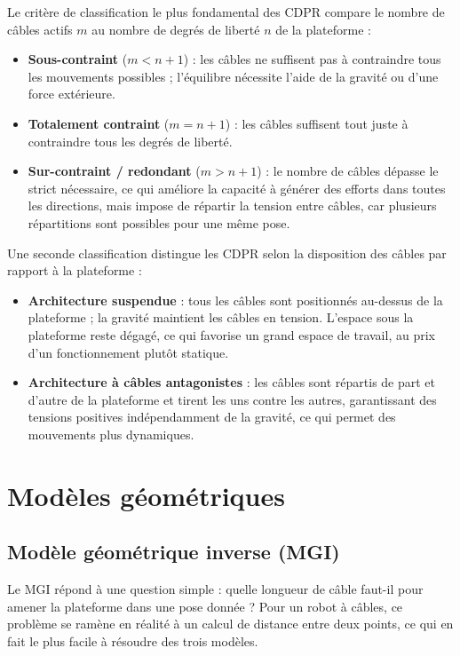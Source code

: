 Le critère de classification le plus fondamental des CDPR compare le nombre de câbles actifs \( m \) au nombre de degrés de liberté \( n \) de la plateforme :

\begin{itemize}[itemsep=3pt]
  \item \textbf{Sous-contraint} (\( m < n+1 \)) : les câbles ne suffisent pas à contraindre tous les mouvements possibles ; l'équilibre nécessite l'aide de la gravité ou d'une force extérieure.
  \item \textbf{Totalement contraint} (\( m = n+1 \)) : les câbles suffisent tout juste à contraindre tous les degrés de liberté.
  \item \textbf{Sur-contraint / redondant} (\( m > n+1 \)) : le nombre de câbles dépasse le strict nécessaire, ce qui améliore la capacité à générer des efforts dans toutes les directions, mais impose de répartir la tension entre câbles, car plusieurs répartitions sont possibles pour une même pose.
\end{itemize}

Une seconde classification distingue les CDPR selon la disposition des câbles par rapport à la plateforme :

\begin{itemize}[itemsep=3pt]
  \item \textbf{Architecture suspendue} : tous les câbles sont positionnés au-dessus de la plateforme ; la gravité maintient les câbles en tension. L'espace sous la plateforme reste dégagé, ce qui favorise un grand espace de travail, au prix d'un fonctionnement plutôt statique.
  \item \textbf{Architecture à câbles antagonistes} : les câbles sont répartis de part et d'autre de la plateforme et tirent les uns contre les autres, garantissant des tensions positives indépendamment de la gravité, ce qui permet des mouvements plus dynamiques.
\end{itemize}

\section{Modèles géométriques}

\subsection{Modèle géométrique inverse (MGI)}

Le MGI répond à une question simple : quelle longueur de câble faut-il pour amener la plateforme dans une pose donnée ? Pour un robot à câbles, ce problème se ramène en réalité à un calcul de distance entre deux points, ce qui en fait le plus facile à résoudre des trois modèles.

